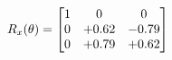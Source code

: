 \documentclass[preview]{standalone}
\begin{document}
\begin{align*}
\special{dvisvgm:raw <g id='unique000'>}R_{x}(\theta) = \begin{bmatrix}1 & 0 & 0 \\0 & +0.62 & -0.79 \\0 & +0.79 & +0.62\end{bmatrix}\special{dvisvgm:raw </g>}
\end{align*}
\end{document}
